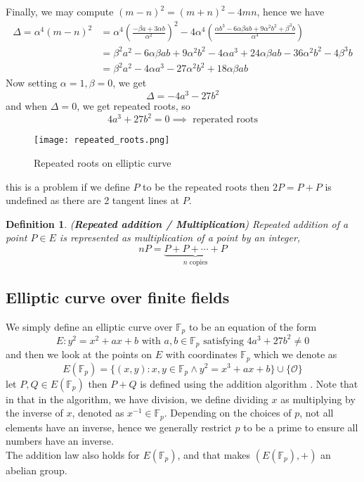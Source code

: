 \documentclass[a4 paper]{article}
\newcommand{\?}{\stackrel{?}{=}}
\newtheorem{definition}{Definition}[section]
\begin{document}
\begin{note}{\bcicosaedre}
Finally, we may compute $ (m-n)^2 = (m+n)^2 - 4mn $, hence we have 
\begin{align*}
    \Delta = \alpha^4(m-n)^2 &=  \alpha^4 \left(\frac{- \beta a +3 \alpha b}{\alpha^2}\right)^2 - 4 \alpha^4\left(\frac{\alpha b^3-6 \alpha \beta a b+9 \alpha^2 b^2+\beta^3 b}{\alpha^4}\right)\\ 
                         & = \beta^2 a^2 - 6 \alpha \beta a b + 9 \alpha^2 b^2 - 4 \alpha a^3 + 24 \alpha \beta a b - 36 \alpha ^2 b^2 - 4 \beta^3 b \\ 
                         & = \beta^2 a^2 - 4 \alpha a^3 - 27 \alpha^2 b^2 + 18 \alpha \beta a b 
\end{align*}
Now setting $ \alpha = 1, \beta = 0 $, we get 
$$ \Delta = -4a^3 - 27b^2 $$
and when $\Delta = 0  $, we get repeated roots, so 
$$ 4a^3 + 27b^2 = 0 \implies \text{ reperated roots} $$
\begin{figure}[H]
    \centering
    \texttt{[image: repeated\_roots.png]}
    \caption{Repeated roots on elliptic curve\label{repeated_roots}}
\end{figure}
this is a problem if we define $ P$ to be the repeated roots then $ 2 P = P + P    $  is undefined as there are 2 tangent lines at $ P $. 
\end{note}

\begin{Definition}
\begin{definition}
(\textbf{Repeated addition / Multiplication}) Repeated addition of a point $ P \in E $ is represented as multiplication of a point by an integer, 
$$ nP = \underbrace{P + P +\cdots + P}_{n \text{ copies}}  $$
\end{definition}
\end{Definition}


\subsection{Elliptic curve over finite fields}
We simply define an elliptic curve over $ \mathbb{F}_p $ to be an equation of the form 
$$ E: y^2 = x^2 + ax +b \text{ with } a,b\in \mathbb{F}_p \text{ satisfying } 4a^3 +27b^2 \neq 0 $$
and then we look at the points on $ E $ with coordinates $ \mathbb{F}_p $ which we denote as 
$$ E(\mathbb{F}_p) = \{(x,y) : x,y\in \mathbb{F}_p \land y^2 = x^3 + ax + b\} \cup \{\mathcal{O}\} $$
let $ P, Q \in E(\mathbb{F}_p) $ then $ P + Q $ is defined using the addition algorithm . Note that in that in the algorithm, we have division, we define dividing $ x $ as multiplying by the inverse of $ x  $, denoted as $ x^{-1} \in \mathbb{F}_p $. Depending on the choices of $ p $, not all elements have an inverse, hence we generally restrict $ p $ to be a prime to ensure all numbers have an inverse.  \\ 
The addition law also holds for $ E(\mathbb{F}_p) $, and that makes $ (E(\mathbb{F}_p), + ) $  an abelian group. 
\end{document}
